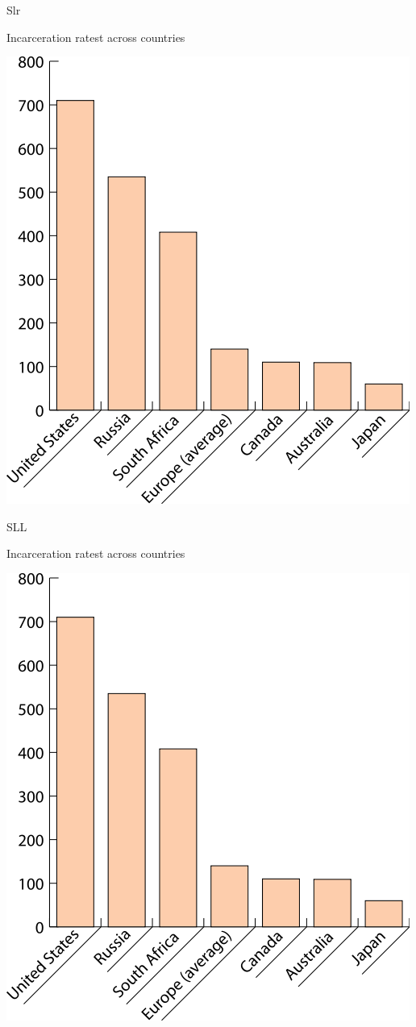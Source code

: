 \begin{chart}{S}{lr}
\caption{Incarceration ratest across countries}
\label{chart:incarceration}
\includegraphics[width=\chartwidth,height=\chartheight]{incarceration}  
\end{chart}

\lipsum[1-4]

\begin{chart}{S}{LL}
\caption{Incarceration ratest across countries}
\label{chart:incarceration}
\includegraphics[width=\chartwidth,height=\chartheight]{incarceration}  
\end{chart}

